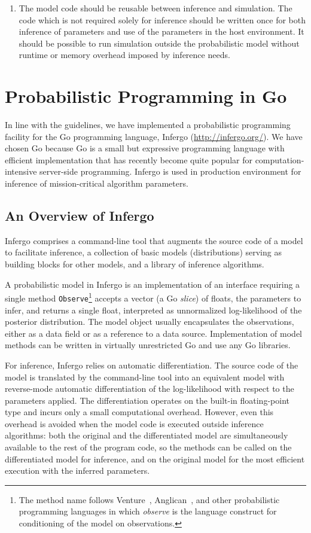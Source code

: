\documentclass[sigplan,screen]{acmart}
\begin{document}
\begin{sloppypar}
\begin{enumerate}
\item The model code should be reusable between inference and
simulation. The code which is not required solely for inference
should be written once for both inference of parameters and use
of the parameters in the host environment.  It should be
possible to run simulation outside the probabilistic model without
runtime or memory overhead imposed by inference needs.
\end{enumerate}

\section{Probabilistic Programming in Go}

In line with the guidelines, we have implemented a probabilistic
programming facility for the Go programming language, Infergo
(\url{http://infergo.org/}). We have chosen Go because Go is a
small but expressive programming language with efficient
implementation that has recently become quite popular for
computation-intensive server-side programming. Infergo is used
in production environment for inference of mission-critical
algorithm parameters.

\subsection{An Overview of Infergo}

Infergo comprises a command-line tool that augments the source
code of a model to facilitate inference, a collection of basic
models (distributions) serving as building blocks for other
models, and a library of inference algorithms.

A probabilistic model in Infergo is an implementation of an
interface requiring a single method
\lstinline{Observe}\footnote{The method name follows
Venture~\cite{MSP14}, Anglican~\cite{TMY+16}, and other
probabilistic programming languages in which \textit{observe} is
the language construct for conditioning of the model on
observations.} accepts a vector (a Go \textit{slice}) of floats,
the parameters to infer, and returns a single float, interpreted
as unnormalized log-likelihood of the posterior distribution.
The model object usually encapsulates the observations, either
as a data field or as a reference to a data source.
Implementation of model methods can be written in virtually
unrestricted Go and use any Go libraries.

For inference, Infergo relies on automatic differentiation. The
source code of the model is translated by the command-line tool
into an equivalent model with reverse-mode automatic
differentiation of the log-likelihood with respect to the
parameters applied. The differentiation operates on the built-in
floating-point type and incurs only a small computational
overhead. However, even this overhead is avoided when the model
code is executed outside inference algorithms: both the original
and the differentiated model are simultaneously available to the
rest of the program code, so the methods can be called on the
differentiated model for inference, and on the original model
for the most efficient execution with the inferred parameters.


\end{sloppypar}
\end{document}
